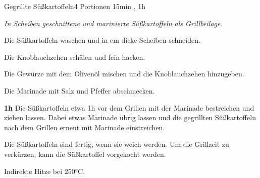 \documentclass[../recipe-collections/cooking.tex]{subfiles}
\begin{document}
\begin{recipe}{Gegrillte Süßkartoffeln}{4 Portionen }{15min , 1h }

  \freeform{}\textit{In Scheiben geschnittene und marinierte Süßkartoffeln als Grillbeilage.}


  Die Süßkartoffeln waschen und in  cm dicke Scheiben schneiden.


  Die Knoblauchzehen schälen und fein hacken.


  Die Gewürze mit dem Olivenöl mischen und die Knoblauchzehen hinzugeben.


  Die Marinade mit Salz und Pfeffer abschmecken.

  \newstep{}\textbf{1h}
  Die Süßkartoffeln etwa 1h vor dem Grillen mit der Marinade bestreichen und ziehen lassen.
  Dabei etwas Marinade übrig lassen und die gegrillten Süßkartoffeln nach dem Grillen erneut mit Marinade einstreichen.

  \freeform{}\hrulefill{}

  \freeform{}
  Die Süßkartoffeln sind fertig, wenn sie weich werden. Um die Grillzeit zu verkürzen, kann die Süßkartoffel vorgekocht werden.

  \freeform{}
  Indirekte Hitze bei 250°C.

\end{recipe}
\end{document}
